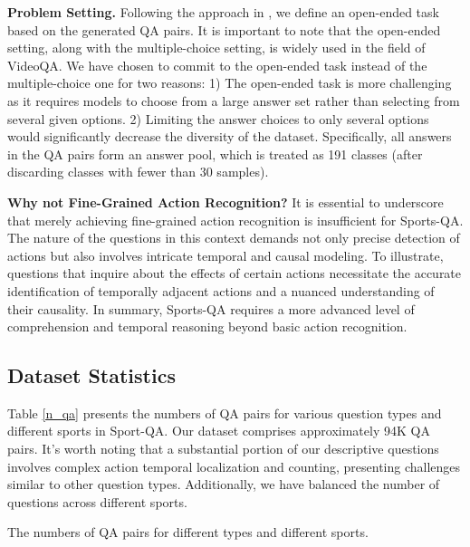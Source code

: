 {\noindent \textbf{Problem Setting.} Following the approach in \citep{jang2017tgif, xu2017video}, we define an open-ended task based on the generated QA pairs. It is important to note that the open-ended setting, along with the multiple-choice setting, is widely used in the field of VideoQA. We have chosen to commit to the open-ended task instead of the multiple-choice one for two reasons: 1) The open-ended task is more challenging as it requires models to choose from a large answer set rather than selecting from several given options. 2) Limiting the answer choices to only several options would significantly decrease the diversity of the dataset. Specifically, all answers in the QA pairs form an answer pool, which is treated as 191 classes (after discarding classes with fewer than 30 samples). 

\noindent \textbf{Why not Fine-Grained Action Recognition?} It is essential to underscore that merely achieving fine-grained action recognition is insufficient for Sports-QA. The nature of the questions in this context demands not only precise detection of actions but also involves intricate temporal and causal modeling. To illustrate, questions that inquire about the effects of certain actions necessitate the accurate identification of temporally adjacent actions and a nuanced understanding of their causality. In summary, Sports-QA requires a more advanced level of comprehension and temporal reasoning beyond basic action recognition.

\subsection{Dataset Statistics}


Table \ref{n_qa} presents the numbers of QA pairs for various question types and different sports in Sport-QA. Our dataset comprises approximately 94K QA pairs. It's worth noting that a substantial portion of our descriptive questions involves complex action temporal localization and counting, presenting challenges similar to other question types. Additionally, we have balanced the number of questions across different sports.

\begin{table}[tbp]
\caption{The numbers of QA pairs for different types and different sports.}
\label{n_qa}


\end{table}}
